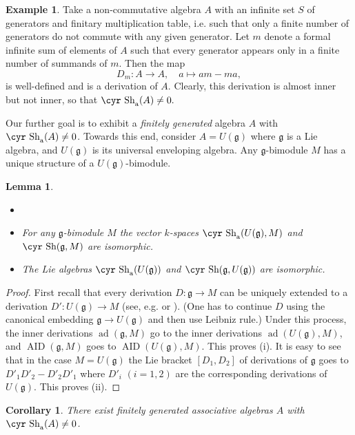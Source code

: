 \documentclass[11pt,reqno]{amsart}
\numberwithin{equation}{section}
\newtheorem{lemma}[theorem]{Lemma}
\newtheorem{cor}[theorem]{Corollary}
\theoremstyle{definition}
\newtheorem{example}[theorem]{Example}
\newcommand{\AID}{{\operatorname{ AID}}}
\newcommand{\ad}{{\operatorname{ ad}}}
\def\Sha{\text{\cyr Sh}}
\def\g{\mathfrak g}
\begin{document}
\begin{example} \label{ex:add}
Take a non-commutative algebra $A$ with an infinite set $S$ of generators and finitary multiplication table,
i.e. such that only a finite number of generators do not commute with any given generator.
Let $m$ denote a formal infinite sum of elements of $A$ such that every generator appears only in a finite
number of summands of $m$. Then the map
$$
D_m\colon A\to A, \quad a\mapsto am-ma,
$$
is well-defined and is a derivation of $A$. Clearly, this derivation is almost inner but not inner,
so that $\Sha_{\text{\rm{a}}}(A)\ne 0.$
\end{example}

Our further goal is to exhibit a {\it finitely generated} algebra $A$ with $\Sha_{\text{\rm{a}}}(A)\ne 0$.
Towards this end, consider $A=U(\g )$ where $\g$ is a Lie algebra, and $U(\g )$ is its universal enveloping algebra.
Any $\g$-bimodule $M$ has a unique structure of a $U(\g)$-bimodule.


\begin{lemma} \label{lem:sha-add-lie}
\begin{itemize}
\item[]
\item[(i)] For any $\g$-bimodule $M$ the vector $k$-spaces
$\Sha_{\text{\rm{a}}}(U(\g), M)$ and $\Sha (\g,M)$ are isomorphic.
\item[(ii)]
The Lie algebras $\Sha_{\text{\rm{a}}}(U(\g))$ and $\Sha (\g,U(\g ))$ are isomorphic.
\end{itemize}\end{lemma}

\begin{proof}
First recall that every derivation $D\colon \g\to M$ can be uniquely extended
to a derivation $D'\colon U(\g )\to M$ (see, e.g. \cite[Lemma~2.1.3]{Dix} or
\cite[XIII.2]{CE}). (One has to continue $D$ using the canonical embedding
$\g\to U(\g)$ and then use Leibniz rule.) Under this process, the inner
derivations $\ad (\g, M)$ go to the inner derivations $\ad (U(\g), M)$,
and $\AID (\g, M)$ goes to $\AID (U(\g), M)$. This proves (i). It is easy to see that
in the case $M=U(\g )$ the Lie bracket $[D_1,D_2]$ of derivations of $\g$ goes to
$D'_1D'_2-D'_2D'_1$ where $D'_i$ $(i=1,2)$ are the corresponding derivations of $U(\g)$.
This proves (ii).
\end{proof}

\begin{cor}
There exist finitely generated associative algebras $A$ with $\Sha_{\text{\rm{a}}}(A)\ne 0$.
\end{cor}
\end{document}
